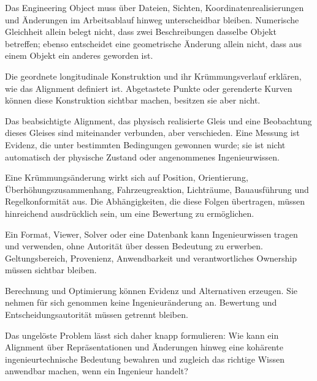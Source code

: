 \begin{description}[style=nextline]
\item[Identität]
Das Engineering Object muss über Dateien, Sichten, Koordinatenrealisierungen
und Änderungen im Arbeitsablauf hinweg unterscheidbar bleiben. Numerische
Gleichheit allein belegt nicht, dass zwei Beschreibungen dasselbe Objekt
betreffen; ebenso entscheidet eine geometrische Änderung allein nicht, dass
aus einem Objekt ein anderes geworden ist.

\item[Konstruktive Absicht]
Die geordnete longitudinale Konstruktion und ihr Krümmungsverlauf erklären,
wie das Alignment definiert ist. Abgetastete Punkte oder gerenderte Kurven
können diese Konstruktion sichtbar machen, besitzen sie aber nicht.

\item[Realität und Beobachtung]
Das beabsichtigte Alignment, das physisch realisierte Gleis und eine
Beobachtung dieses Gleises sind miteinander verbunden, aber verschieden. Eine
Messung ist Evidenz, die unter bestimmten Bedingungen gewonnen wurde; sie ist
nicht automatisch der physische Zustand oder angenommenes Ingenieurwissen.

\item[Änderung und Folge]
Eine Krümmungsänderung wirkt sich auf Position, Orientierung,
Überhöhungszusammenhang, Fahrzeugreaktion, Lichträume, Bauausführung und
Regelkonformität aus. Die Abhängigkeiten, die diese Folgen übertragen, müssen
hinreichend ausdrücklich sein, um eine Bewertung zu ermöglichen.

\item[Knowledge Ownership]
Ein Format, Viewer, Solver oder eine Datenbank kann Ingenieurwissen tragen und
verwenden, ohne Autorität über dessen Bedeutung zu erwerben. Geltungsbereich,
Provenienz, Anwendbarkeit und verantwortliches Ownership müssen sichtbar
bleiben.

\item[Entscheidung]
Berechnung und Optimierung können Evidenz und Alternativen erzeugen. Sie nehmen
für sich genommen keine Ingenieuränderung an. Bewertung und
Entscheidungsautorität müssen getrennt bleiben.
\end{description}

Das ungelöste Problem lässt sich daher knapp formulieren: Wie kann ein
Alignment über Repräsentationen und Änderungen hinweg eine kohärente
ingenieurtechnische Bedeutung bewahren und zugleich das richtige Wissen
anwendbar machen, wenn ein Ingenieur handelt?

